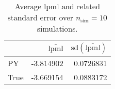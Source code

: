 \begin{table}[H]

\caption{Average lpml and related standard error over $n_{\text{sim}} = 10$ simulations.}
\centering
\begin{tabular}[t]{lrr}
\toprule
  & $\overbar{\text{lpml}}$ & $\text{sd}(\overbar{\text{lpml}})$\\
\midrule
PY & -3.814902 & 0.0726831\\
True & -3.669154 & 0.0883172\\
\bottomrule
\end{tabular}
\end{table}